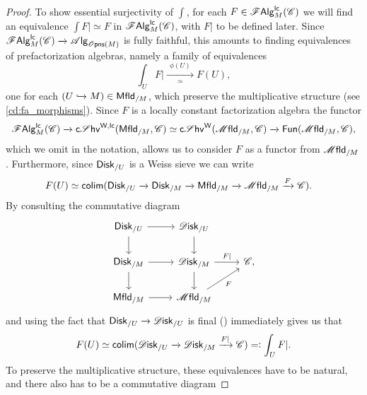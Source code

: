 \documentclass[../text]{subfiles}
\begin{document}
\begin{proof}
    To show essential surjectivity of $\int$, for each $F \in \mathscr{F} \mathsf{Alg}^{\mathsf{lc}}_M (\mathscr{C})$ we will find an equivalence $\int F| \simeq F$ in $\mathscr{F} \mathsf{Alg}^{\mathsf{lc}}_M (\mathscr{C})$, with $F|$ to be defined later. Since $\lcfa_M (\catC) \xrightarrow{} \alg{\opens(M)}$ is fully faithful, this amounts to finding equivalences of prefactorization algebras, namely a family of equivalences
    \begin{equation}
        \int_U F| \xrightarrow[\simeq]{\ \ \phi (U) \ \ } F(U),
    \end{equation}
    one for each $(U \xhookrightarrow{} M) \in \mfld[r]_{/M}$, which preserve the multiplicative structure (see \cref{cd:fa_morphisms}). Since $F$ is a locally constant factorization algebra the functor
    \begin{equation}
        \lcfa_M (\catC) \xrightarrow{} \csheaves[W, lc](\mfld[r]_{/M}, \catC) \simeq \csheaves[W](\mfld_{/M}, \catC) \xrightarrow{} \mathsf{Fun}(\mfld_{/M}, \catC),
    \end{equation}
    which we omit in the notation, allows us to consider $F$ as a functor from $\mfld_{/M}$. Furthermore, since $\disk[r]_{/U}$ is a Weiss sieve we can write
    \begin{align}
        F(U) &\simeq \mathsf{colim} (\disk[r]_{/U} \xrightarrow{} \disk[r]_{/M} \xrightarrow{} \mfld[r]_{/M} \xrightarrow{} \mfld_{/M} \xrightarrow{F} \catC).
    \end{align}
    By consulting the commutative diagram
    \begin{equation}
        \begin{tikzcd}
            \disk[r]_{/U} \arrow[d] \arrow[r] & \disk_{/U} \arrow[d] & \\
            \disk[r]_{/M} \arrow[d] \arrow[r] & \disk_{/M} \arrow[d] \arrow[r, "F|"] & \catC, \\
            \mfld[r]_{/M} \arrow[r] & \mfld_{/M} \arrow[ru, "F"'] &  
        \end{tikzcd}
    \end{equation}
    and using the fact that $\disk[r]_{/U} \xrightarrow{} \disk_{/U}$ is final (\cite[prop.2.22]{aft_fhstrat}) immediately gives us that
    \begin{equation}
        F(U) \simeq \mathsf{colim} (\disk_{/U} \xrightarrow{} \disk_{/M} \xrightarrow{F|} \catC) =: \int_U F|.
    \end{equation}
    To preserve the multiplicative structure, these equivalences have to be natural, and there also has to be a commutative diagram

\end{proof}
\end{document}
